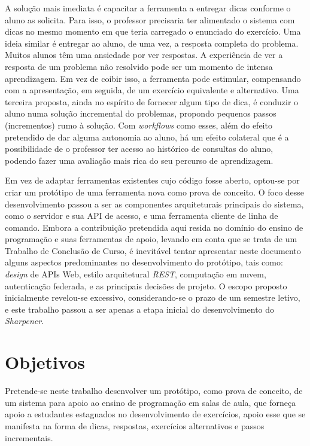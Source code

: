 A solução mais imediata é capacitar a ferramenta a entregar dicas conforme
o aluno as solicita. Para isso, o professor precisaria ter alimentado o sistema
com dicas no mesmo momento em que teria carregado o enunciado do exercício.
Uma ideia similar é entregar ao aluno, de uma vez, a resposta completa do problema.
Muitos alunos têm uma ansiedade por ver respostas. 
A experiência de ver a resposta de um problema não resolvido pode ser um momento
de intensa aprendizagem.
Em vez de coibir isso, a ferramenta pode estimular, compensando com a 
apresentação, em seguida, de um exercício equivalente e alternativo.
Uma terceira proposta, ainda no espírito de fornecer algum tipo de dica,
é conduzir o aluno numa solução incremental do problemas, propondo pequenos
passos (incrementos) rumo à solução.
Com \emph{workflows} como esses, além do efeito pretendido de dar alguma 
autonomia ao aluno, há um efeito colateral que é a possibilidade de o professor
ter acesso ao histórico de consultas do aluno, podendo fazer uma avaliação
mais rica do seu percurso de aprendizagem.

Em vez de adaptar ferramentas existentes cujo código fosse aberto,
optou-se por criar um protótipo de uma ferramenta nova como prova de conceito.
O foco desse desenvolvimento passou a ser as componentes arquiteturais 
principais do sistema, como o servidor e sua API de acesso, e
uma ferramenta cliente de linha de comando.
Embora a contribuição pretendida aqui resida no domínio do
ensino de programação e suas ferramentas de apoio,
levando em conta que se trata de um Trabalho de Conclusão de Curso,
é inevitável tentar apresentar neste documento
alguns aspectos predominantes no desenvolvimento do protótipo, 
tais como: \emph{design} de APIs Web, estilo arquitetural \emph{REST}, computação em nuvem, autenticação federada,
e as principais decisões de projeto.
O escopo proposto inicialmente revelou-se excessivo, considerando-se o prazo de
um semestre letivo, e este trabalho passou a ser apenas a etapa inicial do
desenvolvimento do \emph{Sharpener}.

\section{Objetivos}
Pretende-se neste trabalho desenvolver um protótipo, como prova de conceito, de um sistema para apoio 
ao ensino de programação em salas de aula, que forneça apoio a estudantes estagnados no
desenvolvimento de exercícios, apoio esse que se manifesta
na forma de dicas, respostas, exercícios alternativos e
passos incrementais.

